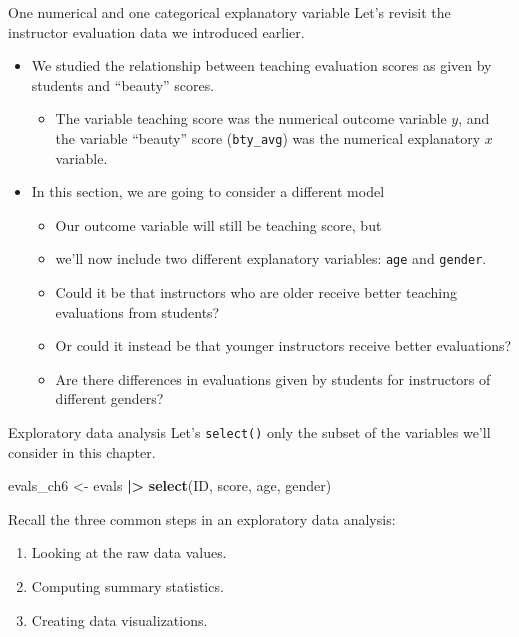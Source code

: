 \documentclass[
  ignorenonframetext,
]{beamer}
\newenvironment{Shaded}{\begin{snugshade}}{\end{snugshade}}
\newcommand{\FunctionTok}[1]{\textcolor[rgb]{0.13,0.29,0.53}{\textbf{#1}}}
\newcommand{\NormalTok}[1]{#1}
\newcommand{\OtherTok}[1]{\textcolor[rgb]{0.56,0.35,0.01}{#1}}
\newcommand{\SpecialCharTok}[1]{\textcolor[rgb]{0.81,0.36,0.00}{\textbf{#1}}}
\providecommand{\tightlist}{%
  \setlength{\itemsep}{0pt}\setlength{\parskip}{0pt}}
\begin{document}
\begin{frame}[fragile]{One numerical and one categorical explanatory
variable}
\label{one-numerical-and-one-categorical-explanatory-variable}
Let's revisit the instructor evaluation data we introduced earlier.

\begin{itemize}
\item
  We studied the relationship between teaching evaluation scores as
  given by students and ``beauty'' scores.

  \begin{itemize}
  \tightlist
  \item
    The variable teaching score was the numerical outcome variable
    \(y\), and the variable ``beauty'' score (\texttt{bty\_avg}) was the
    numerical explanatory \(x\) variable.
  \end{itemize}
\item
  In this section, we are going to consider a different model

  \begin{itemize}
  \tightlist
  \item
    Our outcome variable will still be teaching score, but
  \item
    we'll now include two different explanatory variables: \texttt{age}
    and \texttt{gender}.
  \item
    Could it be that instructors who are older receive better teaching
    evaluations from students?
  \item
    Or could it instead be that younger instructors receive better
    evaluations?
  \item
    Are there differences in evaluations given by students for
    instructors of different genders?
  \end{itemize}
\end{itemize}
\end{frame}

\begin{frame}[fragile]{Exploratory data analysis}
\label{exploratory-data-analysis-8}
Let's \texttt{select()} only the subset of the variables we'll consider
in this chapter.

\normalsize

\begin{Shaded}
\begin{Highlighting}[]
\NormalTok{evals\_ch6 }\OtherTok{\textless{}{-}}\NormalTok{ evals }\SpecialCharTok{|\textgreater{}}
  \FunctionTok{select}\NormalTok{(ID, score, age, gender)}
\end{Highlighting}
\end{Shaded}

\normalsize

Recall the three common steps in an exploratory data analysis:

\begin{enumerate}
\tightlist
\item
  Looking at the raw data values.
\item
  Computing summary statistics.
\item
  Creating data visualizations.
\end{enumerate}
\end{frame}
\end{document}
